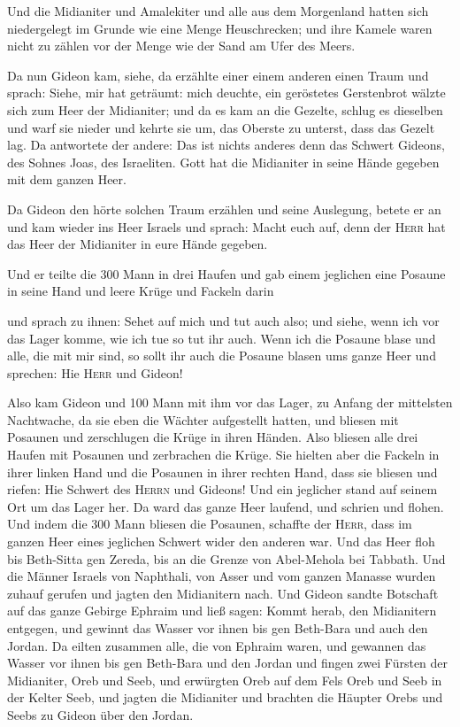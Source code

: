  Und die Midianiter und Amalekiter und alle aus dem
Morgenland hatten sich niedergelegt im Grunde wie eine Menge
Heuschrecken; und ihre Kamele waren nicht zu zählen vor der Menge wie
der Sand am Ufer des Meers.

 Da nun Gideon kam, siehe, da erzählte einer einem
anderen einen Traum und sprach: Siehe, mir hat geträumt: mich deuchte,
ein geröstetes Gerstenbrot wälzte sich zum Heer der Midianiter; und da
es kam an die Gezelte, schlug es dieselben und warf sie nieder und
kehrte sie um, das Oberste zu unterst, dass das Gezelt lag.
 Da antwortete der andere: Das ist nichts anderes denn
das Schwert Gideons, des Sohnes Joas, des Israeliten. Gott hat die
Midianiter in seine Hände gegeben mit dem ganzen Heer.

 Da Gideon den hörte solchen Traum erzählen und seine
Auslegung, betete er an und kam wieder ins Heer Israels und sprach:
Macht euch auf, denn der \textsc{Herr} hat das Heer der Midianiter in
eure Hände gegeben.

 Und er teilte die 300 Mann in drei Haufen und gab einem
jeglichen eine Posaune in seine Hand und leere Krüge und Fackeln darin

 und sprach zu ihnen: Sehet auf mich und tut auch also;
und siehe, wenn ich vor das Lager komme, wie ich tue so tut ihr auch.
 Wenn ich die Posaune blase und alle, die mit mir sind,
so sollt ihr auch die Posaune blasen ums ganze Heer und sprechen: Hie
\textsc{Herr} und Gideon!

 Also kam Gideon und 100 Mann mit ihm vor das Lager, zu
Anfang der mittelsten Nachtwache, da sie eben die Wächter aufgestellt
hatten, und bliesen mit Posaunen und zerschlugen die Krüge in ihren
Händen.  Also bliesen alle drei Haufen mit Posaunen und
zerbrachen die Krüge. Sie hielten aber die Fackeln in ihrer linken Hand
und die Posaunen in ihrer rechten Hand, dass sie bliesen und riefen: Hie
Schwert des \textsc{Herrn} und Gideons!  Und ein
jeglicher stand auf seinem Ort um das Lager her. Da ward das ganze Heer
laufend, und schrien und flohen.  Und indem die 300 Mann
bliesen die Posaunen, schaffte der \textsc{Herr}, dass im ganzen Heer
eines jeglichen Schwert wider den anderen war. Und das Heer floh bis
Beth-Sitta gen Zereda, bis an die Grenze von Abel-Mehola bei Tabbath.
 Und die Männer Israels von Naphthali, von Asser und vom
ganzen Manasse wurden zuhauf gerufen und jagten den Midianitern nach.
 Und Gideon sandte Botschaft auf das ganze Gebirge
Ephraim und ließ sagen: Kommt herab, den Midianitern entgegen, und
gewinnt das Wasser vor ihnen bis gen Beth-Bara und auch den Jordan. Da
eilten zusammen alle, die von Ephraim waren, und gewannen das Wasser vor
ihnen bis gen Beth-Bara und den Jordan  und fingen zwei
Fürsten der Midianiter, Oreb und Seeb, und erwürgten Oreb auf dem Fels
Oreb und Seeb in der Kelter Seeb, und jagten die Midianiter und brachten
die Häupter Orebs und Seebs zu Gideon über den Jordan.

